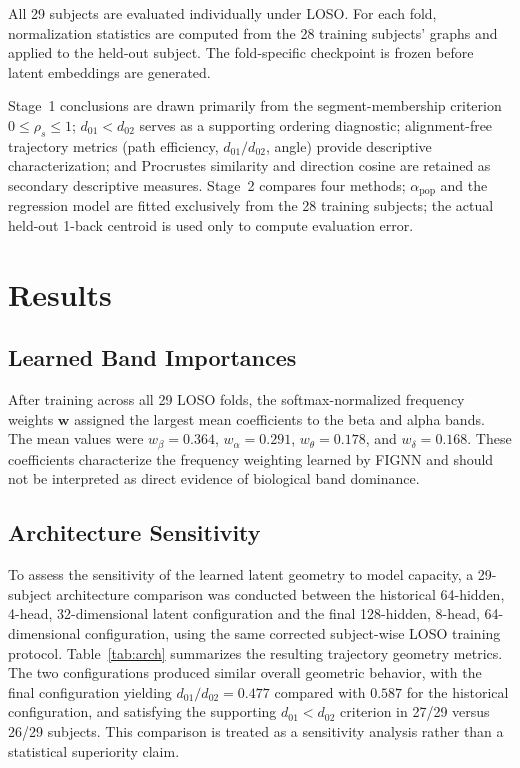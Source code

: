 \documentclass{ieeeaccess}
\begin{document}
All 29 subjects are evaluated individually under LOSO. For each fold,
normalization statistics are computed from the 28 training subjects' graphs and
applied to the held-out subject. The fold-specific checkpoint is frozen before
latent embeddings are generated.

Stage~1 conclusions are drawn primarily from the segment-membership criterion
$0\leq\rho_s\leq1$; $d_{01}<d_{02}$ serves as a supporting ordering diagnostic;
alignment-free trajectory metrics (path efficiency, $d_{01}/d_{02}$, angle)
provide descriptive characterization; and Procrustes similarity and direction
cosine are retained as secondary descriptive measures. Stage~2 compares four
methods; $\alpha_{\mathrm{pop}}$ and the regression model are fitted exclusively
from the 28 training subjects; the actual held-out 1-back centroid is used only
to compute evaluation error.

\section{Results}
\label{sec:results}

\subsection{Learned Band Importances}

After training across all 29 LOSO folds, the softmax-normalized frequency
weights $\mathbf{w}$ assigned the largest mean coefficients to the beta and
alpha bands. The mean values were $w_{\beta}=0.364$, $w_{\alpha}=0.291$,
$w_{\theta}=0.178$, and $w_{\delta}=0.168$. These coefficients characterize
the frequency weighting learned by FIGNN and should not be interpreted as
direct evidence of biological band dominance.

\subsection{Architecture Sensitivity}

To assess the sensitivity of the learned latent geometry to model capacity,
a 29-subject architecture comparison was conducted between the historical
64-hidden, 4-head, 32-dimensional latent configuration and the final
128-hidden, 8-head, 64-dimensional configuration, using the same corrected
subject-wise LOSO training protocol. Table~\ref{tab:arch} summarizes the
resulting trajectory geometry metrics. The two configurations produced
similar overall geometric behavior, with the final configuration yielding
$d_{01}/d_{02}=0.477$ compared with $0.587$ for the historical
configuration, and satisfying the supporting $d_{01}<d_{02}$ criterion in
27/29 versus 26/29 subjects. This comparison is treated as a sensitivity
analysis rather than a statistical superiority claim.
\end{document}
